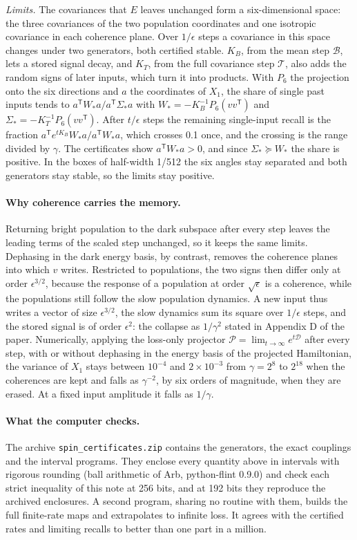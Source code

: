 \documentclass[a4paper,11pt]{article}
\begin{document}
\emph{Limits.} The covariances that $E$ leaves unchanged form a six-dimensional space: the three covariances of the
two population coordinates and one isotropic covariance in each coherence plane. Over $1/\epsilon$ steps a covariance
in this space changes under two generators, both certified stable. $K_B$, from the mean step $\mathcal B$, lets a
stored signal decay, and $K_T$, from the full covariance step $\mathcal T$, also adds the random signs of later
inputs, which turn it into products. With $P_6$ the projection onto the six directions and $a$ the coordinates of
$X_1$, the share of single past inputs tends to $a^{\mathsf T}W_*a/a^{\mathsf T}\Sigma_*a$ with
$W_*=-K_B^{-1}P_6(vv^{\mathsf T})$ and $\Sigma_*=-K_T^{-1}P_6(vv^{\mathsf T})$. After $t/\epsilon$ steps the remaining
single-input recall is the fraction $a^{\mathsf T}e^{tK_B}W_*a/a^{\mathsf T}W_*a$, which crosses 0.1 once, and the
crossing is the range divided by $\gamma$. The certificates show $a^{\mathsf T}W_*a>0$, and since
$\Sigma_*\succeq W_*$ the share is positive. In the boxes of half-width 1/512 the six angles stay separated and both
generators stay stable, so the limits stay positive.

\paragraph{Why coherence carries the memory.}
Returning bright population to the dark subspace after every step leaves the leading terms of the scaled step
unchanged, so it keeps the same limits. Dephasing in the dark energy basis, by contrast, removes the coherence planes
into which $v$ writes. Restricted to populations, the two signs then differ only at order $\epsilon^{3/2}$, because the
response of a population at order $\sqrt\epsilon$ is a coherence, while the populations still follow the slow
population dynamics. A new input thus writes a vector of size $\epsilon^{3/2}$, the slow dynamics sum its square over
$1/\epsilon$ steps, and the stored signal is of order $\epsilon^2$: the collapse as $1/\gamma^2$ stated in
Appendix D of the paper. Numerically, applying the loss-only projector $\mathcal P=\lim_{t\to\infty}e^{t\mathcal D}$ after every step, with or without
dephasing in the energy basis of the projected Hamiltonian, the variance of $X_1$ stays between $10^{-4}$ and
$2\times10^{-3}$ from $\gamma=2^8$ to $2^{18}$ when the coherences are kept and falls as $\gamma^{-2}$, by six orders
of magnitude, when they are erased. At a fixed input amplitude it falls as $1/\gamma$.

\paragraph{What the computer checks.}
The archive \texttt{spin\_certificates.zip} contains the generators, the exact
couplings and the interval programs. They enclose every quantity above in intervals with rigorous rounding (ball arithmetic of Arb, python-flint
0.9.0) and check each strict inequality of this note at 256 bits, and at 192 bits they reproduce the archived
enclosures. A second program, sharing no routine with
them, builds the full finite-rate maps and extrapolates to infinite loss. It agrees with
the certified rates and limiting recalls to better than one part in a million.
\end{document}
